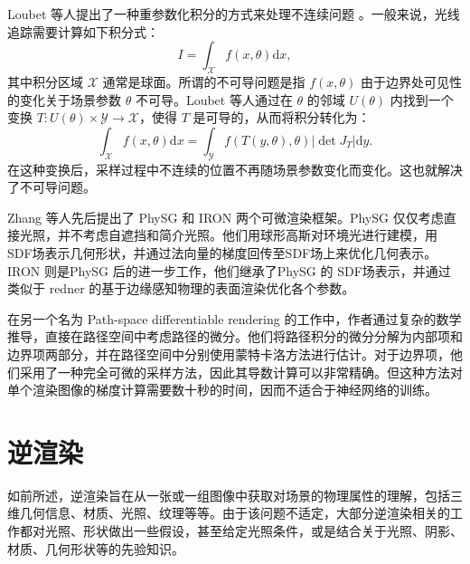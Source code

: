 Loubet 等人提出了一种重参数化积分的方式来处理不连续问题 \cite{Loubet}。一般来说，光线追踪需要计算如下积分式：
\begin{equation}
  I=\int_{\mathcal X}f(x,\theta) \mathrm{d}x,
\end{equation}
其中积分区域 $\mathcal X$ 通常是球面。所谓的不可导问题是指 $f(x, \theta)$ 由于边界处可见性的变化关于场景参数 $\theta$ 不可导。Loubet 等人通过在 $\theta$ 的邻域 $U(\theta)$ 内找到一个变换 $T: U(\theta)\times\mathcal Y\to\mathcal X$，使得 $T$ 是可导的，从而将积分转化为：
\begin{equation}
  \int_{\mathcal{X}}f(x,\theta) \mathrm{d}x=\int_{\mathcal{Y}}f(T(y,\theta),\theta) |\det J_T| \mathrm{d}y.
\end{equation}
在这种变换后，采样过程中不连续的位置不再随场景参数变化而变化。这也就解决了不可导问题。

Zhang 等人先后提出了 PhySG \cite{PhySG} 和 IRON \cite{IRON} 两个可微渲染框架。PhySG 仅仅考虑直接光照，并不考虑自遮挡和简介光照。他们用球形高斯对环境光进行建模，用 SDF场表示几何形状，并通过法向量的梯度回传至SDF场上来优化几何表示。IRON 则是PhySG 后的进一步工作，他们继承了PhySG 的 SDF场表示，并通过类似于 redner 的基于边缘感知物理的表面渲染优化各个参数。

在另一个名为 Path-space differentiable rendering \cite{PSDR} 的工作中，作者通过复杂的数学推导，直接在路径空间中考虑路径的微分。他们将路径积分的微分分解为内部项和边界项两部分，并在路径空间中分别使用蒙特卡洛方法进行估计。对于边界项，他们采用了一种完全可微的采样方法，因此其导数计算可以非常精确。但这种方法对单个渲染图像的梯度计算需要数十秒的时间，因而不适合于神经网络的训练。


\section{逆渲染}

如前所述，逆渲染旨在从一张或一组图像中获取对场景的物理属性的理解，包括三维几何信息、材质、光照、纹理等等。由于该问题不适定，大部分逆渲染相关的工作都对光照、形状做出一些假设，甚至给定光照条件，或是结合关于光照、阴影、材质、几何形状等的先验知识。

